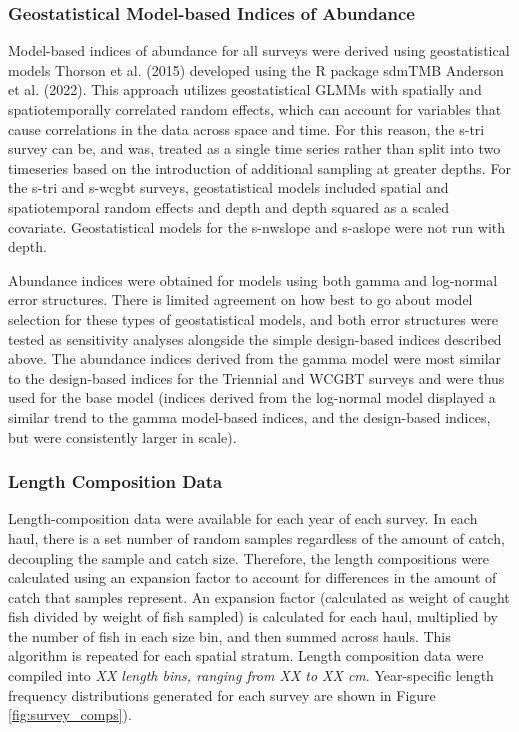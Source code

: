 \documentclass[11pt,
  english,
  letterpaper,
]{article}
\begin{document}
\hypertarget{geostatistical-model-based-indices-of-abundance}{%
\subsubsection{Geostatistical Model-based Indices of Abundance}\label{geostatistical-model-based-indices-of-abundance}}

Model-based indices of abundance for all surveys were derived using geostatistical models Thorson et al. (2015) developed using the R package sdmTMB Anderson et al. (2022). This approach utilizes geostatistical GLMMs with spatially and spatiotemporally correlated random effects, which can account for variables that cause correlations in the data across space and time. For this reason, the \gls{s-tri} survey can be, and was, treated as a single time series rather than split into two timeseries based on the introduction of additional sampling at greater depths. For the \gls{s-tri} and \gls{s-wcgbt} surveys, geostatistical models included spatial and spatiotemporal random effects and depth and depth squared as a scaled covariate. Geostatistical models for the \gls{s-nwslope} and \gls{s-aslope} were not run with depth.

Abundance indices were obtained for models using both gamma and log-normal error structures. There is limited agreement on how best to go about model selection for these types of geostatistical models, and both error structures were tested as sensitivity analyses alongside the simple design-based indices described above. The abundance indices derived from the gamma model were most similar to the design-based indices for the Triennial and WCGBT surveys and were thus used for the base model (indices derived from the log-normal model displayed a similar trend to the gamma model-based indices, and the design-based indices, but were consistently larger in scale).

\hypertarget{length-composition-data}{%
\subsubsection{Length Composition Data}\label{length-composition-data}}

Length-composition data were available for each year of each survey. In each haul, there is a set number of random samples regardless of the amount of catch, decoupling the sample and catch size. Therefore, the length compositions were calculated using an expansion factor to account for differences in the amount of catch that samples represent. An expansion factor (calculated as weight of caught fish divided by weight of fish sampled) is calculated for each haul, multiplied by the number of fish in each size bin, and then summed across hauls. This algorithm is repeated for each spatial stratum. Length composition data were compiled into \emph{XX length bins, ranging from XX to XX cm}. Year-specific length frequency distributions generated for each survey are shown in Figure \ref{fig:survey_comps}).
\end{document}
